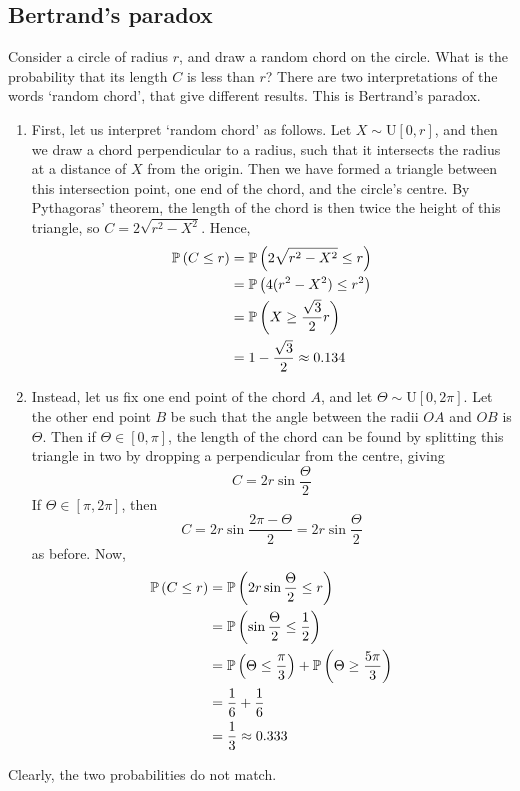 \subsection{Bertrand's paradox}
Consider a circle of radius \(r\), and draw a random chord on the circle.
What is the probability that its length \(C\) is less than \(r\)?
There are two interpretations of the words `random chord', that give different results.
This is Bertrand's paradox.
\begin{enumerate}
	\item First, let us interpret `random chord' as follows.
	      Let \(X \sim \mathrm{U}[0, r]\), and then we draw a chord perpendicular to a radius, such that it intersects the radius at a distance of \(X\) from the origin.
	      Then we have formed a triangle between this intersection point, one end of the chord, and the circle's centre.
	      By Pythagoras' theorem, the length of the chord is then twice the height of this triangle, so \(C = 2\sqrt{r^2 - X^2}\).
	      Hence,
		  \begin{align*}
				\mathbb{P}\left({C \leq r}\right) &= \mathbb{P}\left({2\sqrt{r^2 - X^2} \leq r}\right) \\
				&= \mathbb{P}\left({4(r^2 - X^2) \leq r^2}\right) \\
				&= \mathbb{P}\left({X \geq \frac{\sqrt{3}}{2}r}\right) \\
				&= 1 - \frac{\sqrt 3}{2} \approx 0.134
		  \end{align*}
	\item Instead, let us fix one end point of the chord \(A\), and let \(\Theta \sim \mathrm{U}[0, 2\pi]\).
	      Let the other end point \(B\) be such that the angle between the radii \(OA\) and \(OB\) is \(\Theta\).
	      Then if \(\Theta \in [0, \pi]\), the length of the chord can be found by splitting this triangle in two by dropping a perpendicular from the centre, giving
	      \[
		      C = 2r\sin\frac{\Theta}{2}
	      \]
	      If \(\Theta \in [\pi, 2\pi]\), then
	      \[
		      C = 2r\sin\frac{2\pi - \Theta}{2} = 2r\sin\frac{\Theta}{2}
	      \]
	      as before.
	      Now,
		  \begin{align*}
			\mathbb{P}\left({C \leq r}\right) &= \mathbb{P}\left({2r\sin\frac{\Theta}{2} \leq r}\right) \\
			&= \mathbb{P}\left({\sin\frac{\Theta}{2} \leq \frac{1}{2}}\right) \\
			&= \mathbb{P}\left({\Theta \leq \frac{\pi}{3}}\right) + \mathbb{P}\left({\Theta \geq \frac{5\pi}{3}}\right) \\
			&= \frac{1}{6} + \frac{1}{6} \\
			&= \frac{1}{3} \approx 0.333
		  \end{align*}
\end{enumerate}
Clearly, the two probabilities do not match.
